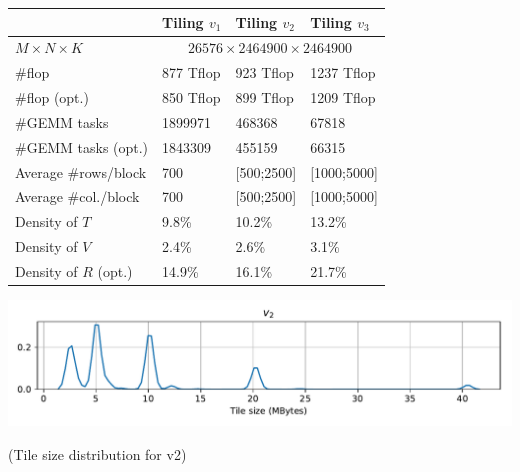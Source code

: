 \begin{frame}
\begin{columns}
    \begin{column}{.5\linewidth}
      \begin{center}
        \begin{tabular}{l|l|l|l}
          & Tiling $v_1$ & Tiling $v_2$ & Tiling $v_3$ \\\hline
          $M\times N\times K$ & \multicolumn{3}{|c}{$26576\times 2464900 \times 2464900$} \\\hline
          \#flop & 877 Tflop & 923 Tflop & 1237 Tflop \\\hline
          \#flop (opt.) & 850 Tflop & 899 Tflop & 1209 Tflop \\\hline
          \#GEMM tasks & 1899971 & 468368 & 67818 \\\hline
          \#GEMM tasks (opt.) & 1843309 &455159& 66315 \\\hline
          Average \#rows/block & 700 & [500;2500] & [1000;5000]\\\hline
          Average \#col./block & 700 & [500;2500] & [1000;5000]\\\hline
          Density of $T$ & 9.8\% &  10.2\% & 13.2\%\\\hline
          Density of $V$ & 2.4\% & 2.6\% & 3.1\%\\\hline
          Density of $R$ (opt.) & 14.9\% & 16.1\% & 21.7\%\\
        \end{tabular}

        \includegraphics[width=\linewidth]{../bs-distrib.pdf}
        
        (Tile size distribution for v2)
      \end{center}
    \end{column}
  \end{columns}
  
\end{frame}

